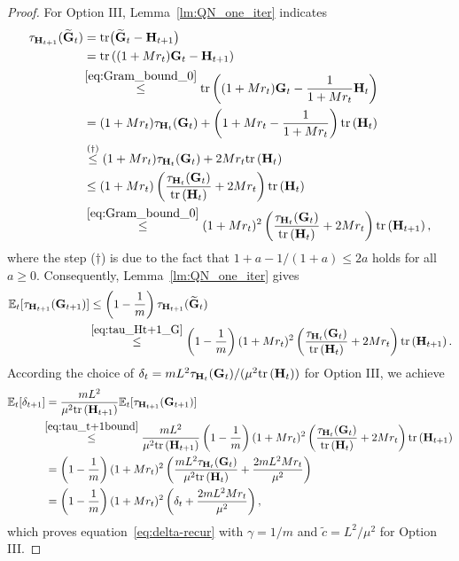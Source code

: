 \documentclass[11pt]{article}
\theoremstyle{plain}
\theoremstyle{definition}
\theoremstyle{remark}
\theoremstyle{plain}
\def\G{{\bf G}}
\def\H{{\bf H}}
\def \tr #1{\text{\rm tr}\left(#1\right)}
\begin{document}
\begin{proof}
For Option III, Lemma~\ref{lm:QN_one_iter} indicates
\begin{align}
    \label{eq:tau_Ht+1_G}
    \begin{split}
\tau_{\H_{t+1}}(\widetilde{\G}_t)
&={\rm tr}\big(\widetilde{\G}_t-\H_{t+1}\big)\\
&=\tr{(1+Mr_t)\G_t-\H_{t+1}}\\
&\!\overset{\eqref{eq:Gram_bound_0}}{\leq}
\tr{(1+Mr_t)\G_t-\frac{1}{1+Mr_t}\H_t}\\
&=(1+Mr_t)\tau_{\H_t}(\G_t)
 +\left(1+Mr_t-\frac{1}{1+Mr_t}\right)\tr{\H_t}\\
&\overset{\text{($\dag$)}}{\leq}(1+Mr_t)\tau_{\H_t}(\G_t)+2Mr_t\tr{\H_t}\\
&\leq(1+Mr_t)
 \left(\frac{\tau_{\H_t}(\G_t)}{\tr{\H_t}}+2Mr_t\right)
 \tr{\H_t}\\
&\overset{\eqref{eq:Gram_bound_0}}{\leq}(1+Mr_t)^2
 \left(\frac{\tau_{\H_t}(\G_t)}{\tr{\H_t}}+2Mr_t\right)
 \tr{\H_{t+1}},
\end{split}
\end{align}
where the step ($\dag$) is due to the fact that $1+a-1/(1+a)
\leq2a$ holds for all $a\geq 0$.
Consequently, Lemma~\ref{lm:QN_one_iter} gives
\begin{align}\label{eq:tau_t+1bound}
\begin{split}    
\mathbb E_t[\tau_{\H_{t+1}}(\G_{t+1})] 
&\leq \left(1-\frac1m\right) 
\tau_{\H_{t+1}}(\widetilde{\G}_t) \\
&\!\overset{\eqref{eq:tau_Ht+1_G}}{\leq} 
\left(1-\frac1m\right)(1+Mr_t)^2
\left(\frac{\tau_{\H_t}(\G_t)}{\tr{\H_t}}+2Mr_t\right)
\tr{\H_{t+1}}.
\end{split}
\end{align}
According the choice of $\delta_t={mL^2\tau_{\H_t}(\G_t)}/(\mu^2\tr{\H_t})$ for Option III, we achieve
\begin{align*}
\mathbb E_t[\delta_{t+1}]
&=\frac{mL^2}{\mu^2\tr{\H_{t+1}}}
\mathbb E_t[\tau_{\H_{t+1}}(\G_{t+1})]\\
&\!\!\overset{\eqref{eq:tau_t+1bound}}{\leq}\frac{mL^2}{\mu^2\tr{\H_{t+1}}}
\left(1-\frac1m\right)(1+Mr_t)^2
\left(\frac{\tau_{\H_t}(\G_t)}{\tr{\H_t}}+2Mr_t\right)
\tr{\H_{t+1}}\\
&=\left(1-\frac1m\right)(1+Mr_t)^2
\left(\frac{mL^2\tau_{\H_t}(\G_t)}
{\mu^2\tr{\H_t}}+\frac{2mL^2Mr_t}{\mu^2}\right)\\
&=\left(1-\frac1m\right)(1+Mr_t)^2
\left(\delta_t+\frac{2mL^2Mr_t}{\mu^2}\right),
\end{align*}
which proves equation~\eqref{eq:delta-recur} with $\gamma=1/m$ and $\tilde c=L^2/\mu^2$ for Option III.


\end{proof}
\end{document}
